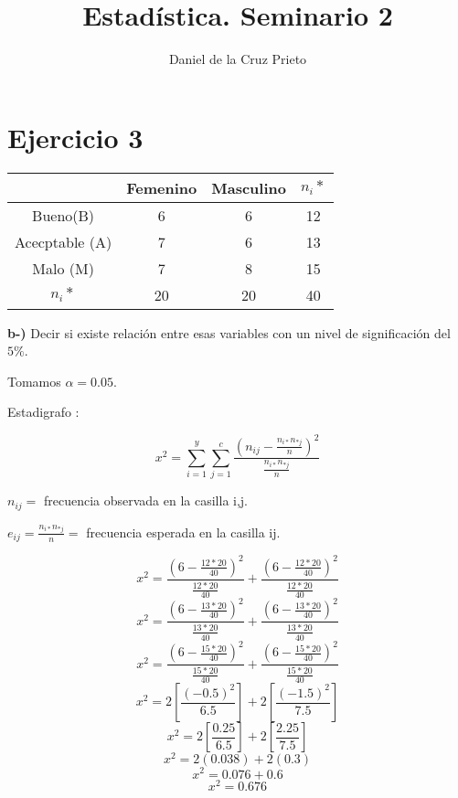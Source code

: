 \documentclass{article}
\begin{document}
	\title{Estad\'istica.  Seminario 2}
	\author{Daniel de la Cruz Prieto} 
	\maketitle
	
		\section*{Ejercicio 3}
		
		\begin{table}[ht]		
			\centering
			\begin{tabular}{|c|c|c|c|}
				\hline 
				& Femenino & Masculino & $n_{i}*$ \\
				\hline
				Bueno(B) & 6 & 6 & 12 \\
				\hline
				Acecptable (A) & 7 & 6 & 13 \\
				\hline
				Malo (M) & 7 & 8 & 15 \\
				\hline
				$n_{i}*$ & 20 & 20 & 40 \\
				\hline
			\end{tabular}
		\end{table}
		
		\begin{flushleft}
			\textbf{b-)} Decir si existe relaci\'on entre esas variables con un nivel de significaci\'on del~$5\%$.
		\end{flushleft}
		\begin{flushleft}
			Tomamos $ \alpha = 0.05$.
		\end{flushleft}
		\begin{flushleft}
			Estadigrafo :
		\end{flushleft}
		$$ x^2 = \sum_{i=1}^{y}\sum_{j=1}^{c}\frac{\left(n_{ij} - \frac{n_{i*}n_{*j}}{n}\right)^2}{\frac{n_{i*}n_{*j}}{n}}$$
		\begin{flushleft}
			$n_{ij} =$ frecuencia observada en la casilla i,j.
		\end{flushleft}
		\begin{flushleft}
			$e_{ij} = \frac{n_{i*}n_{*j}}{n} =$ frecuencia esperada en la casilla ij.
		\end{flushleft}
		$$x^2 = \frac{\left(6 - \frac{12 * 20}{40}\right)^2}{\frac{12 * 20}{40}} + \frac{\left(6 - \frac{12 * 20}{40}\right)^2}{\frac{12 * 20}{40}}$$
		$$x^2 = \frac{\left(6 - \frac{13 * 20}{40}\right)^2}{\frac{13 * 20}{40}} + \frac{\left(6 - \frac{13 * 20}{40}\right)^2}{\frac{13 * 20}{40}}$$
		$$x^2 = \frac{\left(6 - \frac{15 * 20}{40}\right)^2}{\frac{15 * 20}{40}} + \frac{\left(6 - \frac{15 * 20}{40}\right)^2}{\frac{15 * 20}{40}}$$
		$$x^2 = 2\left[\frac{\left(-0.5\right)^2}{6.5}\right] + 2\left[\frac{\left(-1.5\right)^2}{7.5}\right]$$
		$$x^2 = 2\left[\frac{0.25}{6.5}\right] + 2\left[\frac{2.25}{7.5}\right]$$
		$$x^2 = 2\left(0.038\right) + 2\left(0.3\right)$$
		$$x^2 = 0.076 + 0.6$$
		$$x^2 = 0.676$$
		
\end{document}
